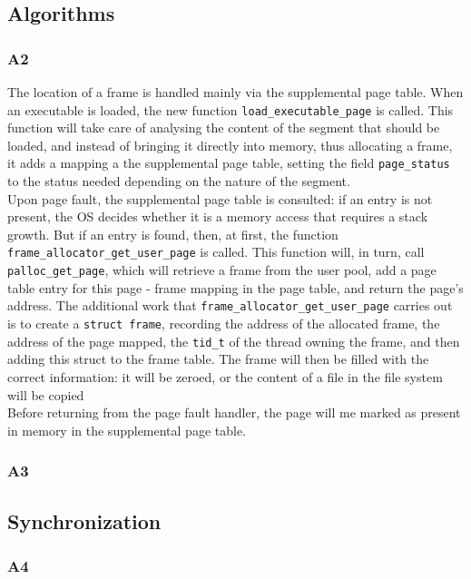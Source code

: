 \documentclass[a4wide, 11pt]{article}
\newcommand{\tx}{\texttt}
\begin{document}
 

\subsection{Algorithms}
\subsubsection{A2}
The location of a frame is handled mainly via the supplemental page table.
When an executable is loaded, the new function \tx{load\_executable\_page} is called. This function will take care of analysing the content of the segment that should be loaded, and instead of bringing it directly into memory, thus allocating a frame, it adds a mapping a the supplemental page table, setting the field \tx{page\_status} to the status needed depending on the nature of the segment. \\
Upon page fault, the supplemental page table is consulted: if an entry is not present, the OS decides whether it is a memory access that requires a stack growth. But if an entry is found, then, at first, the function \tx{frame\_allocator\_get\_user\_page} is called. This function will, in turn, call \tx{palloc\_get\_page}, which will retrieve a frame from the user pool, add a page table entry for this page - frame mapping in the page table, and return the page's address. The additional work that \tx{frame\_allocator\_get\_user\_page} carries out is to create a \tx{struct frame}, recording the address of the allocated frame, the address of the page  mapped, the \tx{tid\_t} of the thread owning the frame, and then adding this struct to the frame table. The frame will then be filled with the correct information: it will be zeroed, or the content of a file in the file system will be copied \\
Before returning from the page fault handler, the page will me marked as present in memory in the supplemental page table.
\subsubsection{A3}

\subsection{Synchronization}
\subsubsection{A4}
\end{document}
